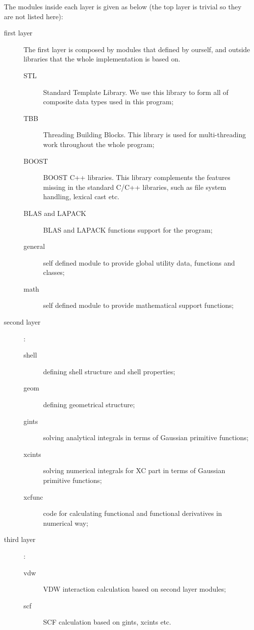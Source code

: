 The modules inside each layer is given as below (the top layer is trivial so they
are not listed here):
\begin{description}
\item [first layer] The first layer is composed by modules that defined by ourself,
and outside libraries that the whole implementation is based on.
\begin{description}
 \item [STL]     Standard Template Library. We use this library to form all of 
 composite data types used in this program;
 \item [TBB]     Threading Building Blocks. This library is used for multi-threading
 work throughout the whole program;
 \item [BOOST]   BOOST C++ libraries. This library complements the features missing 
 in the standard C/C++ libraries, such as file system handling, lexical cast etc.
 \item [BLAS and LAPACK] BLAS and LAPACK functions support for the program;
 \item [general] self defined module to provide global utility data, functions and classes;
 \item [math]    self defined module to provide mathematical support functions;
\end{description}
\item [second layer]:
\begin{description}
 \item [shell]   defining shell structure and shell properties;
 \item [geom]    defining geometrical structure;
 \item [gints]   solving analytical integrals in terms of Gaussian primitive functions; 
 \item [xcints]  solving numerical integrals for XC part in terms of Gaussian primitive 
 functions; 
 \item [xcfunc]  code for calculating functional and functional derivatives in numerical
 way;
\end{description}
\item [third layer]:
\begin{description}
 \item [vdw]  VDW interaction calculation based on second layer modules;
 \item [scf]  SCF calculation based on gints, xcints etc.
\end{description}
\end{description}

